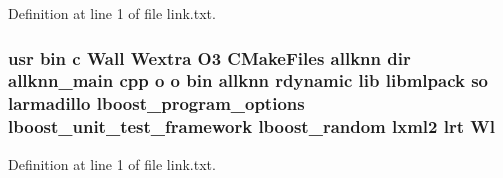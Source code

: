 Definition at line 1 of file link.\-txt.

\subsubsection[{Wl}]{\setlength{\rightskip}{0pt plus 5cm}usr bin c Wall Wextra O3 C\-Make\-Files allknn dir allknn\-\_\-main cpp o o bin allknn rdynamic lib libmlpack so larmadillo lboost\-\_\-program\-\_\-options lboost\-\_\-unit\-\_\-test\-\_\-framework lboost\-\_\-random lxml2 lrt Wl}\label{methods_2neighbor__search_2CMakeFiles_2allknn_8dir_2link_8txt_a527f5b8e156e0072c36264b794c8e54c}


Definition at line 1 of file link.\-txt.

